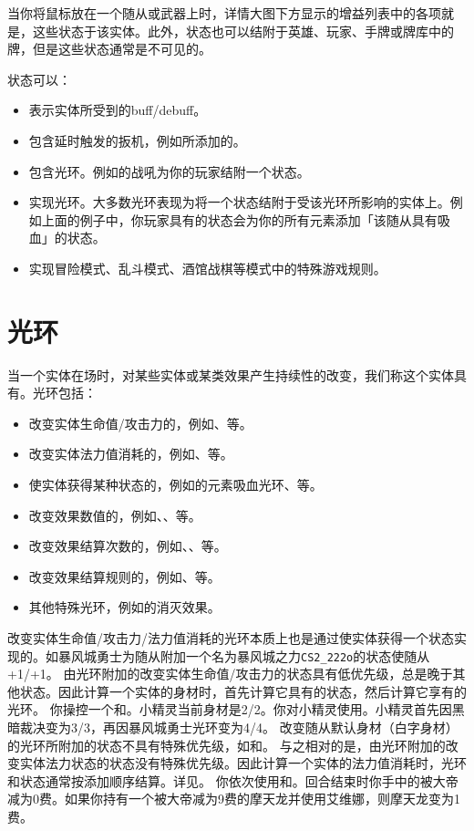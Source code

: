 当你将鼠标放在一个随从或武器上时，详情大图下方显示的增益列表中的各项就是，这些状态于该实体。此外，状态也可以结附于英雄、玩家、手牌或牌库中的牌，但是这些状态通常是不可见的。

状态可以：
\begin{itemize}
    \item 表示实体所受到的buff/debuff。
    \item 包含延时触发的扳机，例如所添加的。
    \item 包含光环。例如的战吼为你的玩家结附一个状态。
    \item 实现光环。大多数光环表现为将一个状态结附于受该光环所影响的实体上。例如上面的例子中，你玩家具有的状态会为你的所有元素添加「该随从具有吸血」的状态。
    \item 实现冒险模式、乱斗模式、酒馆战棋等模式中的特殊游戏规则。
\end{itemize}

\section{光环}
\label{aura}

当一个实体在场时，对某些实体或某类效果产生持续性的改变，我们称这个实体具有。光环包括：
\begin{itemize}
    \item 改变实体生命值/攻击力的，例如、等。
    \item 改变实体法力值消耗的，例如、等。
    \item 使实体获得某种状态的，例如的元素吸血光环、等。
    \item 改变效果数值的，例如、、等。
    \item 改变效果结算次数的，例如、、等。
    \item 改变效果结算规则的，例如、等。
    \item 其他特殊光环，例如的消灭效果。
\end{itemize}

改变实体生命值/攻击力/法力值消耗的光环本质上也是通过使实体获得一个状态实现的。如暴风城勇士为随从附加一个名为暴风城之力\texttt{CS2\_222o}的状态使随从+1/+1。
\notice 由光环附加的改变实体生命值/攻击力的状态具有低优先级，总是晚于其他状态。因此计算一个实体的身材时，首先计算它具有的状态，然后计算它享有的光环。
\example 你操控一个和。小精灵当前身材是2/2。你对小精灵使用。小精灵首先因黑暗裁决变为3/3，再因暴风城勇士光环变为4/4。
\exception 改变随从默认身材（白字身材）的光环所附加的状态不具有特殊优先级，如和。
\notice 与之相对的是，由光环附加的改变实体法力状态的状态没有特殊优先级。因此计算一个实体的法力值消耗时，光环和状态通常按添加顺序结算。详见。
\example 你依次使用和。回合结束时你手中的被大帝减为0费。如果你持有一个被大帝减为9费的摩天龙并使用艾维娜，则摩天龙变为1费。

